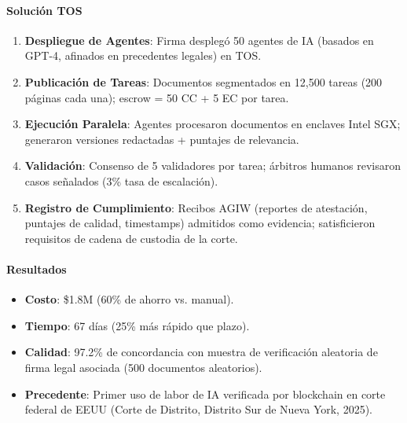 \documentclass[11pt]{article}
\begin{document}
\paragraph{Solución TOS}
\begin{enumerate}[noitemsep]
  \item \textbf{Despliegue de Agentes}: Firma desplegó 50 agentes de IA (basados en GPT-4, afinados en precedentes legales) en TOS.
  \item \textbf{Publicación de Tareas}: Documentos segmentados en 12,500 tareas (200 páginas cada una); escrow = 50 CC + 5 EC por tarea.
  \item \textbf{Ejecución Paralela}: Agentes procesaron documentos en enclaves Intel SGX; generaron versiones redactadas + puntajes de relevancia.
  \item \textbf{Validación}: Consenso de 5 validadores por tarea; árbitros humanos revisaron casos señalados (3\% tasa de escalación).
  \item \textbf{Registro de Cumplimiento}: Recibos AGIW (reportes de atestación, puntajes de calidad, timestamps) admitidos como evidencia; satisficieron requisitos de cadena de custodia de la corte.
\end{enumerate}

\paragraph{Resultados}
\begin{itemize}[noitemsep]
  \item \textbf{Costo}: \$1.8M (60\% de ahorro vs. manual).
  \item \textbf{Tiempo}: 67 días (25\% más rápido que plazo).
  \item \textbf{Calidad}: 97.2\% de concordancia con muestra de verificación aleatoria de firma legal asociada (500 documentos aleatorios).
  \item \textbf{Precedente}: Primer uso de labor de IA verificada por blockchain en corte federal de EEUU (Corte de Distrito, Distrito Sur de Nueva York, 2025).
\end{itemize}
\end{document}

